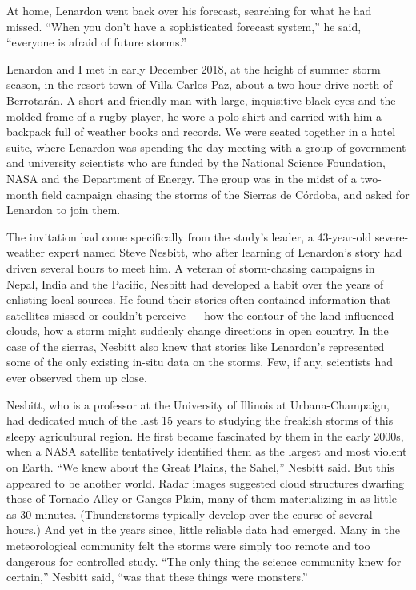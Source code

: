 At home, Lenardon went back over his forecast, searching for what he had
missed. ``When you don't have a sophisticated forecast system,'' he
said, ``everyone is afraid of future storms.''

Lenardon and I met in early December 2018, at the height of summer storm
season, in the resort town of Villa Carlos Paz, about a two-hour drive
north of Berrotarán. A short and friendly man with large, inquisitive
black eyes and the molded frame of a rugby player, he wore a polo shirt
and carried with him a backpack full of weather books and records. We
were seated together in a hotel suite, where Lenardon was spending the
day meeting with a group of government and university scientists who are
funded by the National Science Foundation, NASA and the Department of
Energy. The group was in the midst of a two-month field campaign chasing
the storms of the Sierras de Córdoba, and asked for Lenardon to join
them.

The invitation had come specifically from the study's leader, a
43-year-old severe-weather expert named Steve Nesbitt, who after
learning of Lenardon's story had driven several hours to meet him. A
veteran of storm-chasing campaigns in Nepal, India and the Pacific,
Nesbitt had developed a habit over the years of enlisting local sources.
He found their stories often contained information that satellites
missed or couldn't perceive --- how the contour of the land influenced
clouds, how a storm might suddenly change directions in open country. In
the case of the sierras, Nesbitt also knew that stories like Lenardon's
represented some of the only existing in-situ data on the storms. Few,
if any, scientists had ever observed them up close.

Nesbitt, who is a professor at the University of Illinois at
Urbana-Champaign, had dedicated much of the last 15 years to studying
the freakish storms of this sleepy agricultural region. He first became
fascinated by them in the early 2000s, when a NASA satellite tentatively
identified them as the largest and most violent on Earth. ``We knew
about the Great Plains, the Sahel,'' Nesbitt said. But this appeared to
be another world. Radar images suggested cloud structures dwarfing those
of Tornado Alley or Ganges Plain, many of them materializing in as
little as 30 minutes. (Thunderstorms typically develop over the course
of several hours.) And yet in the years since, little reliable data had
emerged. Many in the meteorological community felt the storms were
simply too remote and too dangerous for controlled study. ``The only
thing the science community knew for certain,'' Nesbitt said, ``was that
these things were monsters.''

